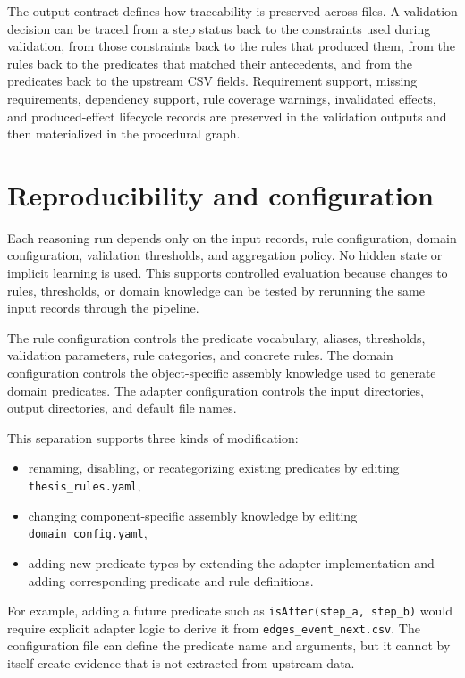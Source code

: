 The output contract defines how traceability is preserved across files. A validation decision can be traced from a step status back to the constraints used during validation, from those constraints back to the rules that produced them, from the rules back to the predicates that matched their antecedents, and from the predicates back to the upstream CSV fields. Requirement support, missing requirements, dependency support, rule coverage warnings, invalidated effects, and produced-effect lifecycle records are preserved in the validation outputs and then materialized in the procedural graph.

\section{Reproducibility and configuration}
\label{sec:implementation-reproducibility}

Each reasoning run depends only on the input records, rule configuration, domain configuration, validation thresholds, and aggregation policy. No hidden state or implicit learning is used. This supports controlled evaluation because changes to rules, thresholds, or domain knowledge can be tested by rerunning the same input records through the pipeline.

The rule configuration controls the predicate vocabulary, aliases, thresholds, validation parameters, rule categories, and concrete rules. The domain configuration controls the object-specific assembly knowledge used to generate domain predicates. The adapter configuration controls the input directories, output directories, and default file names.

This separation supports three kinds of modification:

\begin{itemize}
    \item renaming, disabling, or recategorizing existing predicates by editing \texttt{thesis\_rules.yaml},
    \item changing component-specific assembly knowledge by editing \texttt{domain\_config.yaml},
    \item adding new predicate types by extending the adapter implementation and adding corresponding predicate and rule definitions.
\end{itemize}

For example, adding a future predicate such as \texttt{isAfter(step\_a, step\_b)} would require explicit adapter logic to derive it from \texttt{edges\_event\_next.csv}. The configuration file can define the predicate name and arguments, but it cannot by itself create evidence that is not extracted from upstream data.

